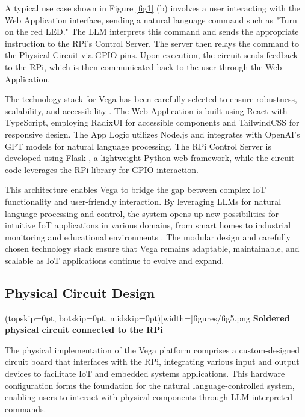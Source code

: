 \documentclass{ieeeaccess}
\begin{document}
A typical use case shown in Figure  \ref{fig1} (b) involves a user interacting with the Web Application interface, sending a natural language command such as "Turn on the red LED." The LLM interprets this command and sends the appropriate instruction to the RPi's Control Server. The server then relays the command to the Physical Circuit via GPIO pins. Upon execution, the circuit sends feedback to the RPi, which is then communicated back to the user through the Web Application.

The technology stack for Vega has been carefully selected to ensure robustness, scalability, and accessibility \cite{math9040308}. The Web Application is built using React \cite{React2024} with TypeScript, employing RadixUI \cite{radix-ui} for accessible components and TailwindCSS \cite{tailwindcss} for responsive design. The App Logic utilizes Node.js and integrates with OpenAI's GPT models \cite{OpenAI_GPT} for natural language processing. The RPi Control Server is developed using Flask \cite{Flask2024}, a lightweight Python web framework, while the circuit code leverages the RPi library for GPIO interaction.

This architecture enables Vega to bridge the gap between complex IoT functionality and user-friendly interaction. By leveraging LLMs for natural language processing and control, the system opens up new possibilities for intuitive IoT applications in various domains, from smart homes to industrial monitoring and educational environments \cite{8067944}. The modular design and carefully chosen technology stack ensure that Vega remains adaptable, maintainable, and scalable as IoT applications continue to evolve and expand.

\subsection{Physical Circuit Design}

\Figure[t!](topskip=0pt, botskip=0pt,
midskip=0pt)[width=\textwidth]{{figures/fig5.png}}
{ \textbf{Soldered physical circuit connected to the RPi}\label{fig2}}

The physical implementation of the Vega platform comprises a custom-designed circuit board that interfaces with the RPi, integrating various input and output devices to facilitate IoT and embedded systems applications. This hardware configuration forms the foundation for the natural language-controlled system, enabling users to interact with physical components through LLM-interpreted commands.
\end{document}
